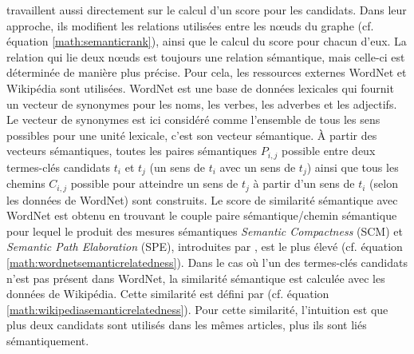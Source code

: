          travaillent aussi directement sur
        le calcul d'un score pour les candidats. Dans leur approche, ils
        modifient les relations utilisées entre les n\oe{}uds du graphe (cf.
        équation \ref{math:semanticrank}), ainsi que le calcul du score pour
        chacun d'eux. La relation qui lie deux n\oe{}uds est toujours une
        relation sémantique, mais celle-ci est déterminée de manière plus
        précise. Pour cela, les ressources externes WordNet
        \cite{miller1995wordnet} et Wikipédia sont utilisées. WordNet est une
        base de données lexicales qui fournit un vecteur de synonymes pour les
        noms, les verbes, les adverbes et les adjectifs. Le vecteur de
        synonymes est ici considéré comme l'ensemble de tous les sens
        possibles pour une unité lexicale, c'est son vecteur sémantique. À
        partir des vecteurs sémantiques, toutes les paires sémantiques $P_{i,
        j}$ possible entre deux termes-clés candidats $t_i$ et $t_j$ (un sens
        de $t_i$ avec un sens de $t_j$) ainsi que tous les chemins $C_{i, j}$
        possible pour atteindre un sens de $t_j$ à partir d'un sens de $t_i$
        (selon les données de WordNet) sont construits. Le score de similarité
        sémantique avec WordNet est obtenu en trouvant le couple paire
        sémantique/chemin sémantique pour lequel le produit des mesures
        sémantiques \textit{Semantic Compactness} (SCM) et \textit{Semantic
        Path Elaboration} (SPE), introduites par
        , est le plus élevé (cf.
        équation \ref{math:wordnetsemanticrelatedness}). Dans le cas où l'un
        des termes-clés candidats n'est pas présent dans WordNet, la
        similarité sémantique est calculée avec les données de Wikipédia.
        Cette similarité est défini par
         (cf. équation
        \ref{math:wikipediasemanticrelatedness}). Pour cette similarité,
        l'intuition est que plus deux candidats sont utilisés dans les mêmes
        articles, plus ils sont liés sémantiquement.
